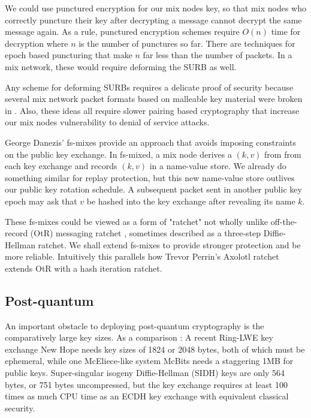\documentclass[twoside,letterpaper]{llncs}
\begin{document}
We could use punctured encryption \cite{punctured_encryption} for our
mix nodes key, so that mix nodes who correctly puncture their key
after decrypting a message cannot decrypt the same message again. 
As a rule, punctured encryption schemes require $O(n)$ time for
decryption where $n$ is the number of punctures so far.  There are
techniques for epoch based puncturing that make $n$ far less than
the number of packets.  In a mix network, these would require
deforming the SURB as well. 

Any scheme for deforming SURBs requires a delicate proof of security
because several mix network packet formats based on malleable key
material were broken in \cite{GD-breaking_universal_reencryption}.  
Also, these ideas all require slower pairing based cryptography that
increase our mix nodes vulnerability to denial of service attacks. 

George Danezis' fs-mixes \cite{fs-mix} provide an approach that
avoids imposing constraints on the public key exchange.  In fs-mixed,
a mix node derives a $(k,v)$ from from each key exchange and records
$(k,v)$  in a name-value store.  We already do something similar for 
replay protection, but this new name-value store outlives our public
key rotation schedule.  A subsequent packet sent in another public
key epoch may ask that $v$ be hashed into the key exchange after
revealing its name $k$.  

These fs-mixes could be viewed as a form of "ratchet" not wholly
unlike off-the-record (OtR) messaging ratchet \cite{??OtR??},
sometimes described as a three-step Diffie-Hellman ratchet.  
We shall extend fs-mixes to provide stronger protection and be more
reliable.  Intuitively this parallels how Trevor Perrin's Axolotl 
ratchet extends OtR with a hash iteration ratchet. 

\subsection{Post-quantum}

An important obstacle to deploying post-quantum cryptography is
the comparatively large key sizes.  As a comparison : 
%
A recent Ring-LWE key exchange New Hope \cite[\S7, p.10]{NewHope} needs
 key sizes of 1824 or 2048 bytes, both of which must be ephemeral,
while one McEliece-like system McBits %
 needs a staggering 1MB for public keys.
%
Super-singular isogeny Diffie-Hellman (SIDH) \cite[p. 21]{SIDH-2016} keys
are only 564 bytes, or 751 bytes uncompressed, but
 the key exchange requires at least 100 times as much CPU time as
 an ECDH key exchange with equivalent classical security.
\end{document}
